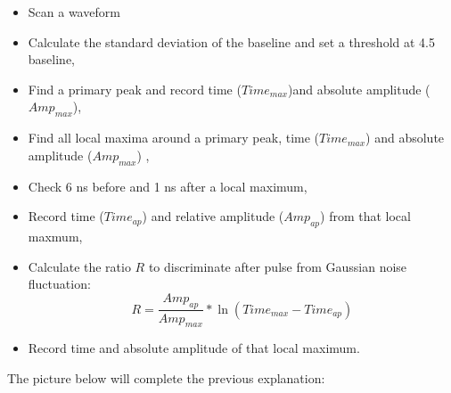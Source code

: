 \documentclass[a4paper, 11pt]{report}%
\begin{document}
  \begin{itemize}
   \item Scan a waveform
   \item Calculate the standard deviation of the baseline and set a threshold at 4.5 baseline,  
   \item Find a primary peak and record time ($Time_{max}$)and absolute amplitude ($Amp_{max}$),
   \item Find all local maxima around a primary peak,  time ($Time_{max}$) and absolute amplitude ($Amp_{max}$) , 
   \item Check 6 ns before and 1 ns after a local maximum, 
   \item Record time ($Time_{ap}$) and relative amplitude ($Amp_{ap}$) from that local maxmum, 
   \item Calculate the ratio $R$ to discriminate after pulse from Gaussian noise fluctuation:
	 \begin{equation}
	  R = \frac{Amp_{ap}}{Amp_{max}}*\ln(Time_{max}-Time_{ap}) 
	 \end{equation}
   \item Record time and absolute amplitude of that local maximum. 
  \end{itemize}
  
  The picture below will complete the previous explanation:
  
\end{document}
